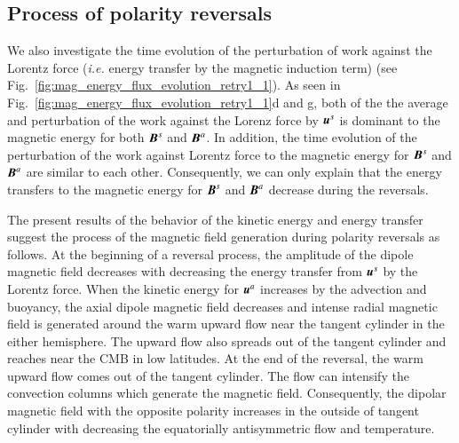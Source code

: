 \subsection{Process of polarity reversals}
We also investigate the time evolution of the perturbation of work against the Lorentz force ({\it i.e.} energy transfer by the magnetic induction term) (see Fig.~\ref{fig:mag_energy_flux_evolution_retry1_1}).
As seen in Fig.~\ref{fig:mag_energy_flux_evolution_retry1_1}d and g, both of the the average and perturbation of the work against the Lorenz force by $\mbox{\boldmath$u$}^s$ is dominant to the magnetic energy for both $\mbox{\boldmath$B$}^s$ and $\mbox{\boldmath$B$}^a$.
In addition, the time evolution of the perturbation of the work against Lorentz force to the magnetic energy for $\mbox{\boldmath$B$}^s$ and $\mbox{\boldmath$B$}^a$ are similar to each other.
Consequently, we can only explain that the energy transfers to the magnetic energy for $\mbox{\boldmath$B$}^s$ and $\mbox{\boldmath$B$}^a$ decrease during the reversals.



The present results of the behavior of the kinetic energy and energy transfer suggest the process of the magnetic field generation during polarity reversals as follows.
At the beginning of a reversal process, the amplitude of the dipole magnetic field decreases with decreasing the energy transfer from $\mbox{\boldmath$u$}^s$ by the Lorentz force. 
When the kinetic energy for $\mbox{\boldmath$u$}^a$ increases by the advection and buoyancy, the axial dipole magnetic field decreases and intense radial magnetic field is generated around the warm upward flow near the tangent cylinder in the either hemisphere. 
The upward flow also spreads out of the tangent cylinder and reaches near the CMB in low latitudes. 
At the end of the reversal, the warm upward flow comes out of the tangent cylinder. 
The flow can intensify the convection columns which generate the magnetic field. 
Consequently, the dipolar magnetic field with the opposite polarity increases in the outside of tangent cylinder with decreasing the equatorially antisymmetric flow and temperature.

